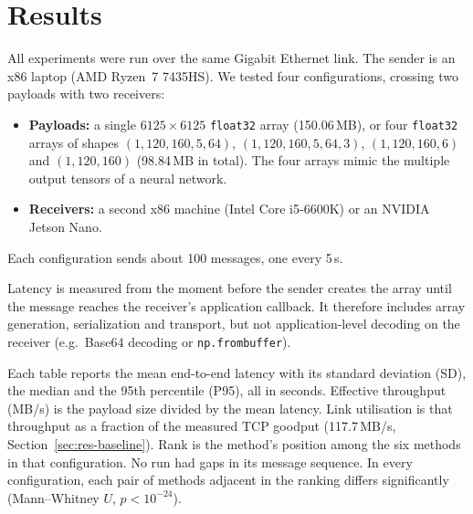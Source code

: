 
\section{Results}
\label{sec:results}

All experiments were run over the same Gigabit Ethernet link. The sender is an x86
laptop (AMD Ryzen~7 7435HS). We tested four configurations, crossing two payloads with
two receivers:
\begin{itemize}
  \item \textbf{Payloads:} a single $6125 \times 6125$ \texttt{float32} array
  (150.06\,MB), or four \texttt{float32} arrays of shapes $(1,120,160,5,64)$,
  $(1,120,160,5,64,3)$, $(1,120,160,6)$ and $(1,120,160)$ (98.84\,MB in total). The
  four arrays mimic the multiple output tensors of a neural network.
  \item \textbf{Receivers:} a second x86 machine (Intel Core i5-6600K) or an NVIDIA
  Jetson Nano.
\end{itemize}
Each configuration sends about 100 messages, one every 5\,s.

Latency is measured from the moment before the sender creates the array until the
message reaches the receiver's application callback. It therefore includes array
generation, serialization and transport, but not application-level decoding on the
receiver (e.g.\ Base64 decoding or \texttt{np.frombuffer}).

Each table reports the mean end-to-end latency with its standard deviation (SD), the
median and the 95th percentile (P95), all in seconds. Effective throughput (MB/s) is
the payload size divided by the mean latency. Link utilisation is that throughput as a
fraction of the measured TCP goodput (117.7\,MB/s, Section~\ref{sec:res-baseline}).
Rank is the method's position among the six methods in that configuration. No run had
gaps in its message sequence. In every configuration, each pair of methods adjacent in
the ranking differs significantly (Mann--Whitney $U$, $p < 10^{-24}$).

